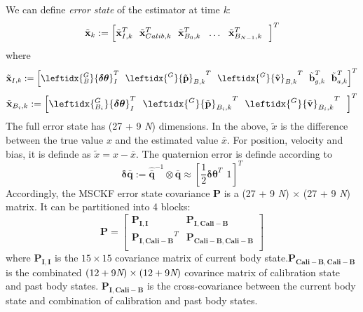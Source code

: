 \documentclass[a4paper, 10pt, conference]{ieeeconf}      %
\begin{document}
We can  define \emph {error state} of the estimator  at time \emph k:
\begin {equation}
\tilde {\textbf x}_k :=\left[  {{\tilde{\textbf x}}_{I,k}}^{ T} \ \
{{\tilde{\textbf x}}_{Calib,k}}^{ T} \ \
{{\tilde{\textbf x}}_{B_0,k}}^{ T}  \ \
\ldots \ \
{{\tilde{\textbf x}}_{B_{N-1},k}}^{ T}  \ \
\right]^T
\end{equation}
where
\begin {equation}
\tilde{\textbf x}_{I,k} :=\left[  \leftidx{_B^G} { \bm {\delta \theta}}_{I}^T \ \
{\leftidx{^G}{\tilde {\textbf p}}_{B,k}}^T \ \
{\leftidx{^G}{\tilde {\textbf v}}_{B,k}}^T \ \
\tilde {\textbf  b}_{g,k}^T\ \
\tilde {\textbf b}_{a,k}^T 
\right]^T
\end{equation}
\begin {equation}
\tilde{\textbf x}_{B_i,k} :=\left[  \leftidx{_{B_i}^G} { \bm {\delta \theta}}_{I}^T \ \
{\leftidx{^G}{\tilde {\textbf p}}_{B_i,k}}^T \ \
{\leftidx{^G}{\tilde {\textbf v}}_{B_i,k}}^T \ \
\right]^T
\end{equation}
The full error state has  (27 + 9 \emph N) dimensions. In the above, $ \tilde x $ is the difference between the true value $ x $ and the estimated
value $ \bar x $. For position, velocity and bias, it is definde as $ \tilde x  = x - \bar x $. The quaternion error is definde  according to 
\begin {equation}
\bm { \delta {\bar q}} := \bm{\hat{\bar q}}^{-1} \otimes \bm {  {\bar q}} \approx \left[\frac{1}{2}{ \bm {\delta \theta}}^T  \ \ 1\right]^T
\end{equation}
Accordingly, the MSCKF error state covariance $ \bm{P} $ is a (27 + 9 \emph N) $ \times $ (27 + 9 \emph N) matrix. It can be partitioned into 4 blocks:
\begin{equation}
\bm{P} = \left[  \begin{matrix} 
\bm{P_{I,I}}  &\bm{P_{I,Cali-B}}  \\
\bm{P_{I,Cali-B}}^T & \bm{P_{Cali-B,Cali-B}}  \\
\end{matrix}   \right] 
\end{equation}
where $ \bm{P_{I,I}} $ is the $ 15 \times 15 $ covariance matrix of current body state.$  \bm{P_{Cali-B,Cali-B}}$ is the combinated $ (12 + 9 \emph N) \times (12 + 9 \emph N )  $   covarince matrix of calibration state and past body states. $\bm{P_{I,Cali-B}}  $ is the cross-covariance
between the current body  state and combination of calibration and past body states.
  
\end{document}
